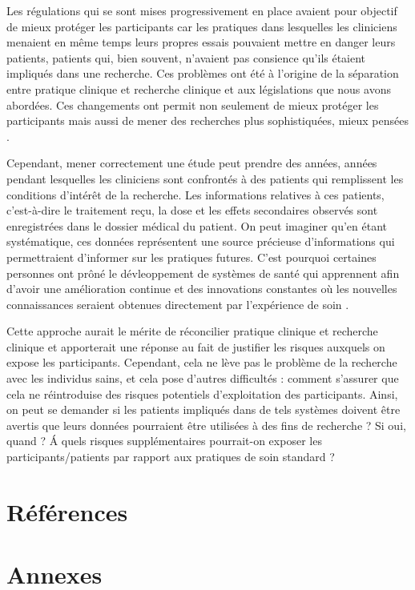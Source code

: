 \documentclass[
  12pt,
]{book}
\begin{document}
Les régulations qui se sont mises progressivement en place avaient pour objectif de mieux protéger les participants car les pratiques dans lesquelles les cliniciens menaient en même temps leurs propres essais pouvaient mettre en danger leurs patients, patients qui, bien souvent, n'avaient pas consience qu'ils étaient impliqués dans une recherche. Ces problèmes ont été à l'origine de la séparation entre pratique clinique et recherche clinique et aux législations que nous avons abordées. Ces changements ont permit non seulement de mieux protéger les participants mais aussi de mener des recherches plus sophistiquées, mieux pensées \citep{sep-clinical-research}.

Cependant, mener correctement une étude peut prendre des années, années pendant lesquelles les cliniciens sont confrontés à des patients qui remplissent les conditions d'intérêt de la recherche. Les informations relatives à ces patients, c'est-à-dire le traitement reçu, la dose et les effets secondaires observés sont enregistrées dans le dossier médical du patient. On peut imaginer qu'en étant systématique, ces données représentent une source précieuse d'informations qui permettraient d'informer sur les pratiques futures. C'est pourquoi certaines personnes ont prôné le dévleoppement de systèmes de santé qui apprennent afin d'avoir une amélioration continue et des innovations constantes où les nouvelles connaissances seraient obtenues directement par l'expérience de soin \citep{institute2013best}.

Cette approche aurait le mérite de réconcilier pratique clinique et recherche clinique et apporterait une réponse au fait de justifier les risques auxquels on expose les participants. Cependant, cela ne lève pas le problème de la recherche avec les individus sains, et cela pose d'autres difficultés : comment s'assurer que cela ne réintroduise des risques potentiels d'exploitation des participants. Ainsi, on peut se demander si les patients impliqués dans de tels systèmes doivent être avertis que leurs données pourraient être utilisées à des fins de recherche ? Si oui, quand ? Á quels risques supplémentaires pourrait-on exposer les participants/patients par rapport aux pratiques de soin standard ?

\chapter{Références}\label{ruxe9fuxe9rences}

\chapter*{Annexes}\label{annexes}
\end{document}
